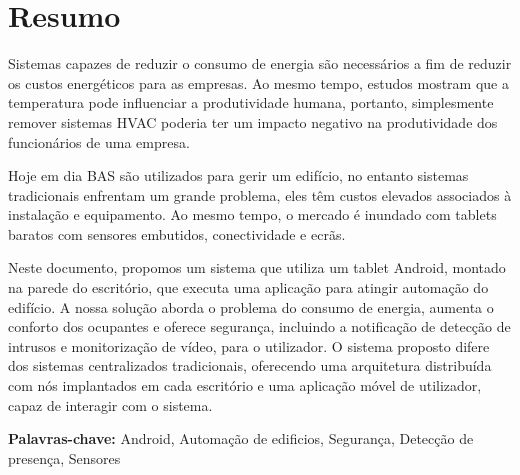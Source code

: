 \chapter*{Resumo}




Sistemas capazes de reduzir o consumo de energia são necessários a fim de reduzir os custos energéticos para as empresas. Ao mesmo tempo, estudos mostram que a temperatura pode influenciar a produtividade humana, portanto, simplesmente remover sistemas HVAC poderia ter um impacto negativo na produtividade dos funcionários de uma empresa.

Hoje em dia \ac{BAS} são utilizados para gerir um edifício, no entanto sistemas tradicionais enfrentam um grande problema, eles têm custos elevados associados à instalação e equipamento. Ao mesmo tempo, o mercado é inundado com tablets baratos com sensores embutidos, conectividade e ecrãs.



Neste documento, propomos um sistema que utiliza um tablet Android, montado na parede do escritório, que executa uma aplicação para atingir automação do edifício. A nossa solução aborda o problema do consumo de energia, aumenta o conforto dos ocupantes e oferece segurança, incluindo a notificação de detecção de intrusos e monitorização de vídeo, para o utilizador. O sistema proposto difere dos sistemas centralizados tradicionais, oferecendo uma arquitetura distribuída com nós implantados em cada escritório e uma aplicação móvel de utilizador, capaz de interagir com o sistema.






\vspace{1cm}

\textbf{\Large Palavras-chave:} Android, Automação de edificios, Segurança, Detecção de presença, Sensores

\cleardoublepage

